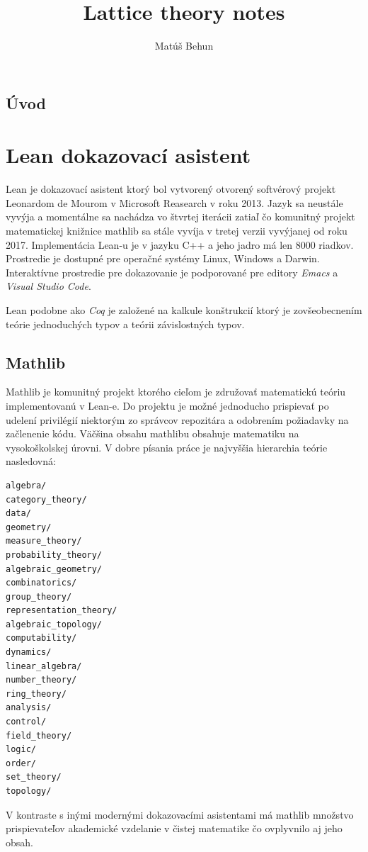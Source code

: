 \documentclass[a4paper,10pt,oneside]{report}%
\author{Mat\'u\v{s} Behun}
\title{Lattice theory notes}
\begin{document}
\tableofcontents

\section{Úvod}

\chapter{Lean dokazovací asistent}
    Lean je dokazovací asistent ktorý bol vytvorený otvorený softvérový projekt
Leonardom de Mourom v Microsoft Reasearch v roku 2013.
    Jazyk sa neustále vyvýja a momentálne sa nachádza vo štvrtej iterácii \cite{lean4} zatiaľ čo komunitný projekt matematickej knižnice mathlib sa stále vyvíja v tretej verzii\cite{lean3} vyvýjanej od roku 2017.
    Implementácia Lean-u je v jazyku C++ a jeho jadro má len 8000 riadkov.
    Prostredie je dostupné pre operačné systémy Linux, Windows a Darwin.
    Interaktívne prostredie pre dokazovanie je podporované pre editory \emph{Emacs} a \emph{Visual Studio Code}.

    Lean podobne ako \emph{Coq} je založené na kalkule konštrukcií ktorý je zovšeobecnením teórie jednoduchých typov
    a teórii závislostných typov.
\section{Mathlib}
    Mathlib je komunitný projekt\cite{mathlib} ktorého cieľom je združovať matematickú
teóriu implementovanú v Lean-e.
    Do projektu je možné jednoducho prispievať po udelení privilégií niektorým zo
správcov repozitára a odobrením požiadavky na začlenenie kódu.
    Väčšina obsahu mathlibu obsahuje matematiku na vysokoškolskej úrovni.
    V dobre písania práce je najvyššia hierarchia teórie nasledovná:
\begin{lstlisting}
algebra/
category_theory/
data/
geometry/
measure_theory/
probability_theory/
algebraic_geometry/
combinatorics/
group_theory/
representation_theory/
algebraic_topology/
computability/
dynamics/
linear_algebra/
number_theory/
ring_theory/
analysis/
control/
field_theory/
logic/
order/
set_theory/
topology/
\end{lstlisting}
    V kontraste s inými modernými dokazovacími asistentami má mathlib množstvo
prispievateľov akademické vzdelanie v čistej matematike\cite{mathlib_paper} čo
ovplyvnilo aj jeho obsah.
\end{document}
